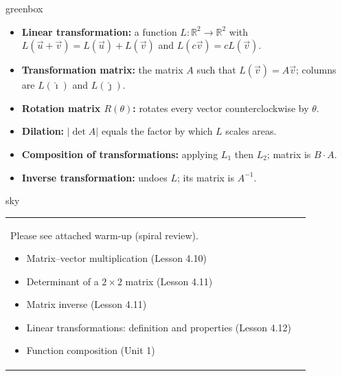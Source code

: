 \documentclass[10pt]{article}
\begin{document}
\begin{skillbox}{greenbox}
\begin{itemize}[leftmargin=1.4em, itemsep=2pt]
  \item \textbf{Linear transformation:} a function $L:\mathbb{R}^2\to\mathbb{R}^2$ with
        $L(\vec u + \vec v)=L(\vec u)+L(\vec v)$ and $L(c\vec v)=cL(\vec v)$.
  \item \textbf{Transformation matrix:} the matrix $A$ such that $L(\vec v)=A\vec v$;
        columns are $L(\hat{\imath})$ and $L(\hat{\jmath})$.
  \item \textbf{Rotation matrix $R(\theta)$:} rotates every vector counterclockwise by $\theta$.
  \item \textbf{Dilation:} $|\det A|$ equals the factor by which $L$ scales areas.
  \item \textbf{Composition of transformations:} applying $L_1$ then $L_2$; matrix is $B\cdot A$.
  \item \textbf{Inverse transformation:} undoes $L$; its matrix is $A^{-1}$.
\end{itemize}
\end{skillbox}

\begin{skillbox}{sky}
    \begin{tabularx}{\linewidth}{@{}X c@{}}
        \begin{minipage}[t]{0.55\linewidth}\vspace{0pt}
            Please see attached warm-up (spiral review).
            \begin{itemize}[leftmargin=1.4em, itemsep=2pt]
              \item Matrix--vector multiplication (Lesson 4.10)
              \item Determinant of a $2\times2$ matrix (Lesson 4.11)
              \item Matrix inverse (Lesson 4.11)
              \item Linear transformations: definition and properties (Lesson 4.12)
              \item Function composition (Unit 1)
            \end{itemize}
        \end{minipage}
        &
        \begin{minipage}[t]{0.38\linewidth}\vspace{0pt}\centering
        \end{minipage}
    \end{tabularx}
\end{skillbox}
\end{document}
